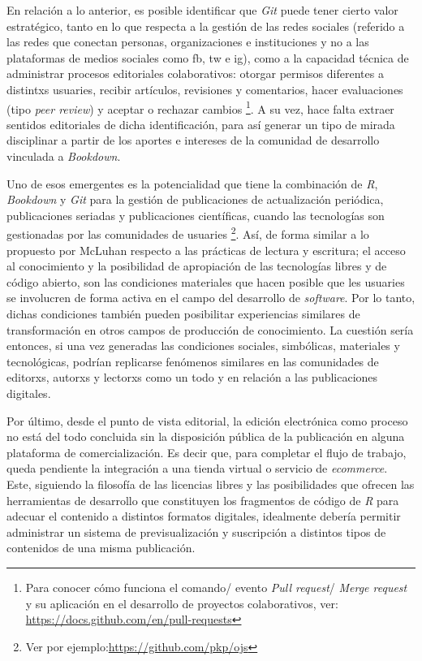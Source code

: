 \documentclass[
]{book}
\begin{document}
En relación a lo anterior, es posible identificar que \emph{Git} puede tener cierto valor estratégico, tanto en lo que respecta a la gestión de las redes sociales (referido a las redes que conectan personas, organizaciones e instituciones y no a las plataformas de medios sociales como fb, tw e ig), como a la capacidad técnica de administrar procesos editoriales colaborativos: otorgar permisos diferentes a distintxs usuaries, recibir artículos, revisiones y comentarios, hacer evaluaciones (tipo \emph{peer review}) y aceptar o rechazar cambios \footnote{Para conocer cómo funciona el comando/ evento \emph{Pull request}/ \emph{Merge request} y su aplicación en el desarrollo de proyectos colaborativos, ver: \url{https://docs.github.com/en/pull-requests}}. A su vez, hace falta extraer sentidos editoriales de dicha identificación, para así generar un tipo de mirada disciplinar a partir de los aportes e intereses de la comunidad de desarrollo vinculada a \emph{Bookdown}.

Uno de esos emergentes es la potencialidad que tiene la combinación de \emph{R}, \emph{Bookdown} y \emph{Git} para la gestión de publicaciones de actualización periódica, publicaciones seriadas y publicaciones científicas, cuando las tecnologías son gestionadas por las comunidades de usuaries \footnote{Ver por ejemplo:\url{https://github.com/pkp/ojs}}. Así, de forma similar a lo propuesto por McLuhan \citep{marshallmcluhanComprenderMediosComunicacion1994} respecto a las prácticas de lectura y escritura; el acceso al conocimiento y la posibilidad de apropiación de las tecnologías libres y de código abierto, son las condiciones materiales que hacen posible que les usuaries se involucren de forma activa en el campo del desarrollo de \emph{software}. Por lo tanto, dichas condiciones también pueden posibilitar experiencias similares de transformación en otros campos de producción de conocimiento. La cuestión sería entonces, si una vez generadas las condiciones sociales, simbólicas, materiales y tecnológicas, podrían replicarse fenómenos similares en las comunidades de editorxs, autorxs y lectorxs como un todo y en relación a las publicaciones digitales.

Por último, desde el punto de vista editorial, la edición electrónica como proceso no está del todo concluida sin la disposición pública de la publicación en alguna plataforma de comercialización. Es decir que, para completar el flujo de trabajo, queda pendiente la integración a una tienda virtual o servicio de \emph{ecommerce}. Este, siguiendo la filosofía de las licencias libres y las posibilidades que ofrecen las herramientas de desarrollo que constituyen los fragmentos de código de \emph{R} para adecuar el contenido a distintos formatos digitales, idealmente debería permitir administrar un sistema de previsualización y suscripción a distintos tipos de contenidos de una misma publicación.
\end{document}
